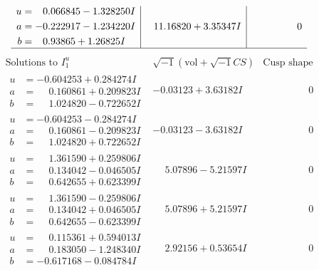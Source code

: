 \documentclass[1p]{elsarticle_modified}
\theoremstyle{definition}
\newcommand{\I}{\sqrt{-1}}
\begin{document}
$$\begin{array}{c|c|c}
\begin{aligned}
u &= \phantom{-}0.066845 - 1.328250 I \\
a &= -0.222917 - 1.234220 I \\
b &= \phantom{-}0.93865 + 1.26825 I\end{aligned}
 & \phantom{-}11.16820 + 3.35347 I & \phantom{-0.000000 } 0\\
 \hline 
 \end{array}$$\newpage$$\begin{array}{c|c|c}  
\text{Solutions to }I^u_{1}& \I (\text{vol} + \sqrt{-1}CS) & \text{Cusp shape}\\
 \hline 
\begin{aligned}
u &= -0.604253 + 0.284274 I \\
a &= \phantom{-}0.160861 + 0.209823 I \\
b &= \phantom{-}1.024820 - 0.722652 I\end{aligned}
 & -0.03123 + 3.63182 I & \phantom{-0.000000 } 0 \\ \hline\begin{aligned}
u &= -0.604253 - 0.284274 I \\
a &= \phantom{-}0.160861 - 0.209823 I \\
b &= \phantom{-}1.024820 + 0.722652 I\end{aligned}
 & -0.03123 - 3.63182 I & \phantom{-0.000000 } 0 \\ \hline\begin{aligned}
u &= \phantom{-}1.361590 + 0.259806 I \\
a &= \phantom{-}0.134042 - 0.046505 I \\
b &= \phantom{-}0.642655 + 0.623399 I\end{aligned}
 & \phantom{-}5.07896 - 5.21597 I & \phantom{-0.000000 } 0 \\ \hline\begin{aligned}
u &= \phantom{-}1.361590 - 0.259806 I \\
a &= \phantom{-}0.134042 + 0.046505 I \\
b &= \phantom{-}0.642655 - 0.623399 I\end{aligned}
 & \phantom{-}5.07896 + 5.21597 I & \phantom{-0.000000 } 0 \\ \hline\begin{aligned}
u &= \phantom{-}0.115361 + 0.594013 I \\
a &= \phantom{-}0.183050 - 1.248340 I \\
b &= -0.617168 - 0.084784 I\end{aligned}
 & \phantom{-}2.92156 + 0.53654 I & \phantom{-0.000000 } 0 \\ \hline\begin{aligned}

\end{aligned}
\end{array}$$
\end{document}
